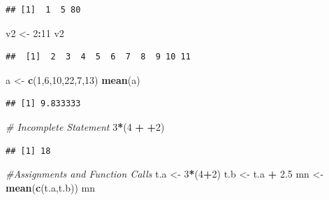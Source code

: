 \documentclass[
]{article}
\newenvironment{Shaded}{\begin{snugshade}}{\end{snugshade}}
\newcommand{\CommentTok}[1]{\textcolor[rgb]{0.56,0.35,0.01}{\textit{#1}}}
\newcommand{\DecValTok}[1]{\textcolor[rgb]{0.00,0.00,0.81}{#1}}
\newcommand{\FloatTok}[1]{\textcolor[rgb]{0.00,0.00,0.81}{#1}}
\newcommand{\FunctionTok}[1]{\textcolor[rgb]{0.13,0.29,0.53}{\textbf{#1}}}
\newcommand{\NormalTok}[1]{#1}
\newcommand{\OtherTok}[1]{\textcolor[rgb]{0.56,0.35,0.01}{#1}}
\newcommand{\SpecialCharTok}[1]{\textcolor[rgb]{0.81,0.36,0.00}{\textbf{#1}}}
\begin{document}
\begin{verbatim}
## [1]  1  5 80
\end{verbatim}

\begin{Shaded}
\begin{Highlighting}[]
\NormalTok{v2 }\OtherTok{\textless{}{-}} \DecValTok{2}\SpecialCharTok{:}\DecValTok{11}
\NormalTok{v2}
\end{Highlighting}
\end{Shaded}

\begin{verbatim}
##  [1]  2  3  4  5  6  7  8  9 10 11
\end{verbatim}

\begin{Shaded}
\begin{Highlighting}[]
\NormalTok{a }\OtherTok{\textless{}{-}} \FunctionTok{c}\NormalTok{(}\DecValTok{1}\NormalTok{,}\DecValTok{6}\NormalTok{,}\DecValTok{10}\NormalTok{,}\DecValTok{22}\NormalTok{,}\DecValTok{7}\NormalTok{,}\DecValTok{13}\NormalTok{)}
\FunctionTok{mean}\NormalTok{(a)}
\end{Highlighting}
\end{Shaded}

\begin{verbatim}
## [1] 9.833333
\end{verbatim}

\begin{Shaded}
\begin{Highlighting}[]
\CommentTok{\# Incomplete Statement}
\DecValTok{3}\SpecialCharTok{*}\NormalTok{(}\DecValTok{4} \SpecialCharTok{+}
     \SpecialCharTok{+}\DecValTok{2}\NormalTok{)}
\end{Highlighting}
\end{Shaded}

\begin{verbatim}
## [1] 18
\end{verbatim}

\begin{Shaded}
\begin{Highlighting}[]
\CommentTok{\#Assignments and Function Calls}
\NormalTok{t.a }\OtherTok{\textless{}{-}} \DecValTok{3}\SpecialCharTok{*}\NormalTok{(}\DecValTok{4}\SpecialCharTok{+}\DecValTok{2}\NormalTok{)}
\NormalTok{t.b }\OtherTok{\textless{}{-}}\NormalTok{ t.a }\SpecialCharTok{+} \FloatTok{2.5}
\NormalTok{mn }\OtherTok{\textless{}{-}} \FunctionTok{mean}\NormalTok{(}\FunctionTok{c}\NormalTok{(t.a,t.b))}
\NormalTok{mn}
\end{Highlighting}
\end{Shaded}
\end{document}
